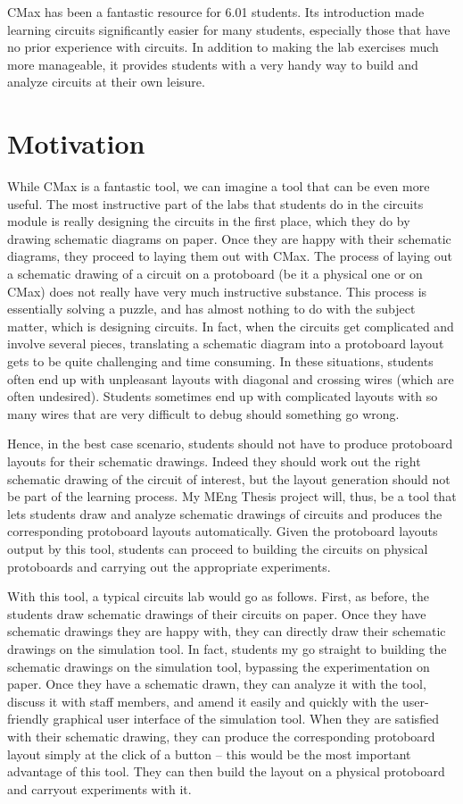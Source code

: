 \documentclass[12pt, doublespacing]{amsart}
\begin{document}
CMax has been a fantastic resource for 6.01 students. Its introduction made learning circuits significantly easier for many students, especially those that have no prior experience with circuits. In addition to making the lab exercises much more manageable, it provides students with a very handy way to build and analyze circuits at their own leisure.

\section{Motivation}
\label{sec:motivation}

While CMax is a fantastic tool, we can imagine a tool that can be even more useful. The most instructive part of the labs that students do in the circuits module is really designing the circuits in the first place, which they do by drawing schematic diagrams on paper. Once they are happy with their schematic diagrams, they proceed to laying them out with CMax. The process of laying out a schematic drawing of a circuit on a protoboard (be it a physical one or on CMax) does not really have very much instructive substance. This process is essentially solving a puzzle, and has almost nothing to do with the subject matter, which is designing circuits. In fact, when the circuits get complicated and involve several pieces, translating a schematic diagram into a protoboard layout gets to be quite challenging and time consuming. In these situations, students often end up with unpleasant layouts with diagonal and crossing wires (which are often undesired). Students sometimes end up with complicated layouts with so many wires that are very difficult to debug should something go wrong.

Hence, in the best case scenario, students should not have to produce protoboard layouts for their schematic drawings. Indeed they should work out the right schematic drawing of the circuit of interest, but the layout generation should not be part of the learning process. My MEng Thesis project will, thus, be a tool that lets students draw and analyze schematic drawings of circuits and produces the corresponding protoboard layouts automatically. Given the protoboard layouts output by this tool, students can proceed to building the circuits on physical protoboards and carrying out the appropriate experiments.

With this tool, a typical circuits lab would go as follows. First, as before, the students draw schematic drawings of their circuits on paper. Once they have schematic drawings they are happy with, they can directly draw their schematic drawings on the simulation tool. In fact, students my go straight to building the schematic drawings on the simulation tool, bypassing the experimentation on paper. Once they have a schematic drawn, they can analyze it with the tool, discuss it with staff members, and amend it easily and quickly with the user-friendly graphical user interface of the simulation tool. When they are satisfied with their schematic drawing, they can produce the corresponding protoboard layout simply at the click of a button -- this would be the most important advantage of this tool. They can then build the layout on a physical protoboard and carryout experiments with it.
\end{document}
